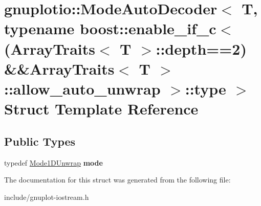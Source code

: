 \hypertarget{structgnuplotio_1_1ModeAutoDecoder_3_01T_00_01typename_01boost_1_1enable__if__c_3_07ArrayTraits_c59d48135a150cfba8b2cca37ce62323}{}\section{gnuplotio\+:\+:Mode\+Auto\+Decoder$<$ T, typename boost\+:\+:enable\+\_\+if\+\_\+c$<$(Array\+Traits$<$ T $>$\+:\+:depth==2) \&\&Array\+Traits$<$ T $>$\+:\+:allow\+\_\+auto\+\_\+unwrap $>$\+:\+:type $>$ Struct Template Reference}
\label{structgnuplotio_1_1ModeAutoDecoder_3_01T_00_01typename_01boost_1_1enable__if__c_3_07ArrayTraits_c59d48135a150cfba8b2cca37ce62323}
\subsection*{Public Types}
\begin{DoxyCompactItemize}
\item 
\mbox{\label{structgnuplotio_1_1ModeAutoDecoder_3_01T_00_01typename_01boost_1_1enable__if__c_3_07ArrayTraits_c59d48135a150cfba8b2cca37ce62323_a9e0be01a3f2d3ea2184dab631c3bb950}} 
typedef \hyperlink{structgnuplotio_1_1Mode1DUnwrap}{Mode1\+D\+Unwrap} {\bfseries mode}
\end{DoxyCompactItemize}


The documentation for this struct was generated from the following file\+:\begin{DoxyCompactItemize}
\item 
include/gnuplot-\/iostream.\+h\end{DoxyCompactItemize}
